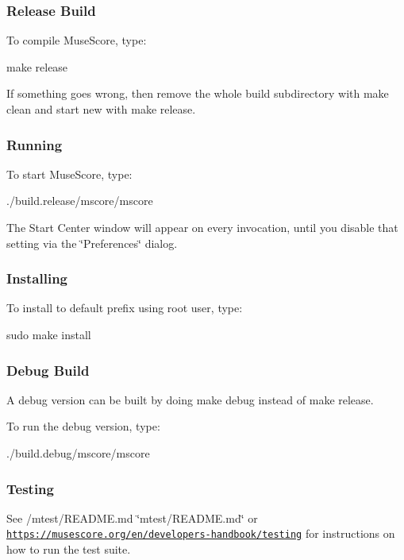 \subsubsection*{Release Build}

To compile Muse\+Score, type\+: \begin{DoxyVerb}make release
\end{DoxyVerb}


If something goes wrong, then remove the whole build subdirectory with {\ttfamily make clean} and start new with {\ttfamily make release}.

\subsubsection*{Running}

To start Muse\+Score, type\+: \begin{DoxyVerb}./build.release/mscore/mscore
\end{DoxyVerb}


The Start Center window will appear on every invocation, until you disable that setting via the \char`\"{}\+Preferences\char`\"{} dialog.

\subsubsection*{Installing}

To install to default prefix using root user, type\+: \begin{DoxyVerb}sudo make install
\end{DoxyVerb}


\subsubsection*{Debug Build}

A debug version can be built by doing {\ttfamily make debug} instead of {\ttfamily make release}.

To run the debug version, type\+: \begin{DoxyVerb}./build.debug/mscore/mscore
\end{DoxyVerb}


\subsubsection*{Testing}

See /mtest/\+R\+E\+A\+D\+ME.md \char`\"{}mtest/\+R\+E\+A\+D\+M\+E.\+md\char`\"{} or \href{https://musescore.org/en/developers-handbook/testing}{\tt https\+://musescore.\+org/en/developers-\/handbook/testing} for instructions on how to run the test suite. 